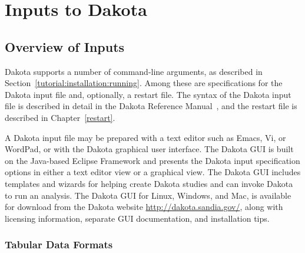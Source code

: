 \chapter{Inputs to Dakota}\label{input}

\section{Overview of Inputs}\label{input:overview}

Dakota supports a number of command-line arguments, as described in
Section~\ref{tutorial:installation:running}.  Among these are
specifications for the Dakota input file and, optionally, a restart
file.  The syntax of the Dakota input file is described in detail in
the Dakota Reference Manual~\cite{RefMan}, and the restart file is
described in Chapter~\ref{restart}.

A Dakota input file may be prepared with a text editor such as Emacs,
Vi, or WordPad, or with the Dakota graphical user interface.
The Dakota GUI is built on the Java-based Eclipse Framework
\cite{Eclipse} and presents the Dakota input specification options in
either a text editor view or a graphical view.  The Dakota GUI includes
templates and wizards for helping create Dakota studies and can invoke
Dakota to run an analysis.  The Dakota GUI for Linux, Windows, and
Mac, is available for download from the Dakota website
\url{http://dakota.sandia.gov/}, along with licensing information,
separate GUI documentation, and installation tips.

\subsection{Tabular Data Formats}\label{input:tabularformat}


